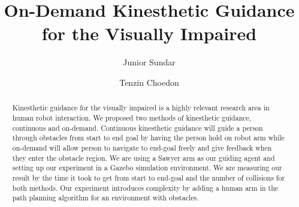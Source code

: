 \documentclass[sigconf]{acmart}
\begin{document}
\pagestyle{plain}
\title{On-Demand Kinesthetic Guidance for the Visually Impaired}

\author{Junior Sundar}

\author{Tenzin Choedon}


\renewcommand{\shortauthors}{Sundar and Choedon}

\begin{abstract}
Kinesthetic guidance for the visually impaired is a highly relevant research area in human robot interaction. We proposed two methods of kinesthetic guidance, continuous and on-demand. Continuous kinesthetic guidance will guide a person through obstacles from start to end goal by having the person hold on robot arm while on-demand will allow person to navigate to end-goal freely and give feedback when they enter the obstacle region. We are using a Sawyer arm as our guiding agent and setting up our experiment in a Gazebo simulation environment. We are measuring our result by the time it took to get from start to end-goal and the number of collisions for both methods. Our experiment introduces complexity by adding a human arm in the path planning algorithm for an environment with obstacles. 
\end{abstract}


\end{document}
